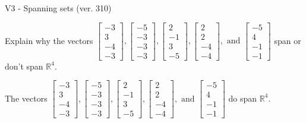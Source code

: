 \begin{exercise}
  \begin{exerciseTitle}V3 - Spanning sets (ver. 310)\end{exerciseTitle}
  \begin{exerciseStatement}
    Explain why the vectors \(\left[\begin{array}{r}
-3 \\
3 \\
-4 \\
-3
\end{array}\right] , \left[\begin{array}{r}
-5 \\
-3 \\
-3 \\
-3
\end{array}\right] , \left[\begin{array}{r}
2 \\
-1 \\
3 \\
-5
\end{array}\right] , \left[\begin{array}{r}
2 \\
2 \\
-4 \\
-4
\end{array}\right] , \text{ and } \left[\begin{array}{r}
-5 \\
4 \\
-1 \\
-1
\end{array}\right]\) span or don't span \(\mathbb{R}^4\). 
	


  \end{exerciseStatement}
  \begin{exerciseAnswer}
   The vectors \(\left[\begin{array}{r}
-3 \\
3 \\
-4 \\
-3
\end{array}\right] , \left[\begin{array}{r}
-5 \\
-3 \\
-3 \\
-3
\end{array}\right] , \left[\begin{array}{r}
2 \\
-1 \\
3 \\
-5
\end{array}\right] , \left[\begin{array}{r}
2 \\
2 \\
-4 \\
-4
\end{array}\right] , \text{ and } \left[\begin{array}{r}
-5 \\
4 \\
-1 \\
-1
\end{array}\right]\) 
  	 do  
	span \(\mathbb{R}^4\).
  



\end{exerciseAnswer}
\end{exercise}

